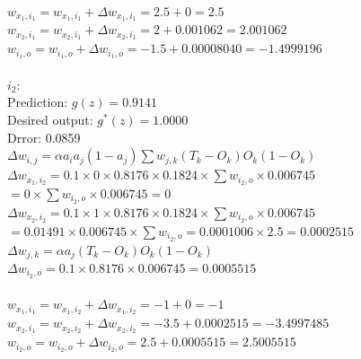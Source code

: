 \documentclass[12pt]{article}
\begin{document}
\begin{enumerate}
\begin{enumerate}
\begin{enumerate}
                \\
                $w_{x_1, i_1} = w_{x_1,i_1} + \Delta w_{x_1,i_1} = 2.5 + 0 = 2.5$\\
                $w_{x_2, i_1} = w_{x_2,i_1} + \Delta w_{x_2,i_1} = 2 + 0.001062 = 2.001062$\\
                $w_{i_1, o} = w_{i_1,o} + \Delta w_{i_1,o} = -1.5 + 0.00008040 = -1.4999196$\\
                \\
                $i_2$:\\
                Prediction: $g(z) = 0.9141$\\
                Desired output: $g^*(z) = 1.0000$\\
                Drror: 0.0859\\
                $\Delta w_{i,j} = \alpha a_i a_j (1-a_j) \sum w_{j,k} (T_k - O_k) O_k (1-O_k)$\\
                $\Delta w_{x_1,i_2} = 0.1 \times 0 \times 0.8176 \times 0.1824 \times \sum w_{i_2,o} \times 0.006745$\\
                $ = 0 \times \sum w_{i_2,o} \times 0.006745 = 0$
                $\Delta w_{x_2,i_2} = 0.1 \times 1 \times 0.8176 \times 0.1824 \times \sum w_{i_2,o} \times 0.006745$\\
                $ = 0.01491 \times 0.006745 \times \sum w_{i_2,o} = 0.0001006 \times 2.5 = 0.0002515$\\
                $\Delta w_{j,k} = \alpha a_j (T_k - O_k) O_k (1-O_k)$\\
                $\Delta w_{i_2,o} = 0.1 \times 0.8176 \times 0.006745 = 0.0005515$\\
                \\
                $w_{x_1, i_1} = w_{x_1,i_2} + \Delta w_{x_1,i_2} = -1 + 0 = -1$\\
                $w_{x_2, i_1} = w_{x_2,i_2} + \Delta w_{x_2,i_2} = -3.5 + 0.0002515 = -3.4997485$\\
                $w_{i_2, o} = w_{i_2,o} + \Delta w_{i_2,o} = 2.5 + 0.0005515 = 2.5005515$\\
        \end{enumerate}


\end{enumerate}
\end{enumerate}
\end{document}
